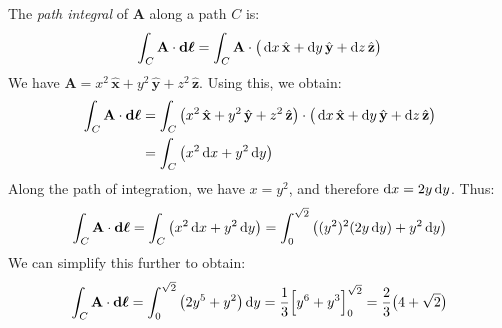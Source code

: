             \begin{solution}
                The \textit{path integral} of $\mathbf{A}$
                along a path $C$ is:
                \begin{equation}
                    \int_{C}\mathbf{A}\cdot\boldsymbol{\mathop{}\!\mathrm{d}{\ell}}
                    =\int_{C}\mathbf{A}\cdot\big(
                        \mathop{}\!\mathrm{d}{x}\,\hat{\mathbf{x}}
                       +\mathop{}\!\mathrm{d}{y}\,\hat{\mathbf{y}}
                       +\mathop{}\!\mathrm{d}{z}\,\hat{\mathbf{z}}
                    \big)
                \end{equation}
                We have
                $\mathbf{A}=x^{2}\,\hat{\mathbf{x}}%
                           +y^{2}\,\hat{\mathbf{y}}%
                           +z^{2}\,\hat{\mathbf{z}}$.
                Using this, we obtain:
                \begin{subequations}
                    \begin{align}
                        \int_{C}\mathbf{A}\cdot
                            \boldsymbol{\mathop{}\!\mathrm{d}{\ell}}
                        &=\int_{C}\big(
                             x^{2}\,\hat{\mathbf{x}}
                            +y^{2}\,\hat{\mathbf{y}}
                            +z^{2}\,\hat{\mathbf{z}}
                        \big)
                        \cdot\big(
                             \mathop{}\!\mathrm{d}{x}\,\hat{\mathbf{x}}
                            +\mathop{}\!\mathrm{d}{y}\,\hat{\mathbf{y}}
                            +\mathop{}\!\mathrm{d}{z}\,\hat{\mathbf{z}}
                        \big)\\
                        &=\int_{C}
                            \big(x^{2}\mathop{}\!\mathrm{d}{x}+y^{2}\mathop{}\!\mathrm{d}{y}\big)
                    \end{align}
                \end{subequations}
                Along the path of integration, we have $x=y^{2}$,
                and therefore $\mathop{}\!\mathrm{d}{x}=2y\mathop{}\!\mathrm{d}{y}$.
                Thus:
                \begin{equation}
                    \int_{C}\mathbf{A}\cdot\boldsymbol{\mathop{}\!\mathrm{d}{\ell}}
                    =\int_{C}\big(x^{2}\mathop{}\!\mathrm{d}{x}+y^{2}\mathop{}\!\mathrm{d}{y}\big)
                    =\int_{0}^{\sqrt{2}}\big(
                        (y^{2})^{2}(2y\mathop{}\!\mathrm{d}{y})+y^{2}\mathop{}\!\mathrm{d}{y}
                    \big)
                \end{equation}
                We can simplify this further to obtain:
                \begin{equation}
                    \int_{C}\mathbf{A}\cdot\boldsymbol{\mathop{}\!\mathrm{d}{\ell}}
                    =\int_{0}^{\sqrt{2}}\big(2y^{5}+y^{2}\big)\mathop{}\!\mathrm{d}{y}
                    =\frac{1}{3}\Big[y^{6}+y^{3}\Big]_{0}^{\sqrt{2}}
                    =\frac{2}{3}\big(4+\sqrt{2}\big)
                \end{equation}
            \end{solution}

